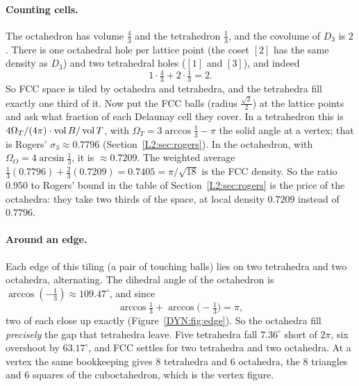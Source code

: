 \paragraph{Counting cells.} The octahedron has volume $\frac43$ and the tetrahedron $\frac13$, and the
covolume of $D_3$ is $2$. There is one octahedral hole per lattice point (the coset $[2]$ has the same
density as $D_3$) and two tetrahedral holes ($[1]$ and $[3]$), and indeed
\[
  1\cdot\tfrac43+2\cdot\tfrac13=2 .
\]
So FCC space is tiled by octahedra and tetrahedra, and the tetrahedra fill exactly one third of it.
Now put the FCC balls (radius $\frac{\sqrt2}2$) at the lattice points and ask what fraction of each
Delaunay cell they cover. In a tetrahedron this is $4\Omega_T/(4\pi)\cdot\operatorname{vol}B/\operatorname{vol} T$, with
$\Omega_T=3\arccos\frac13-\pi$ the solid angle at a vertex; that is Rogers' $\sigma_3\approx0.7796$
(Section~\ref{L2:sec:rogers}). In the octahedron, with $\Omega_O=4\arcsin\frac13$, it is
$\approx0.7209$. The weighted average
$\frac13(0.7796)+\frac23(0.7209)=0.7405=\pi/\sqrt{18}$ is the FCC density. So the ratio $0.950$ to
Rogers' bound in the table of Section~\ref{L2:sec:rogers} is the price of the octahedra: they take two
thirds of the space, at local density $0.7209$ instead of $0.7796$.

\paragraph{Around an edge.} Each edge of this tiling (a pair of touching balls) lies on two tetrahedra
and two octahedra, alternating. The dihedral angle of the octahedron is $\arccos(-\frac13)\approx109.47^\circ$,
and since
\[
  \arccos\tfrac13+\arccos\big(-\tfrac13\big)=\pi ,
\]
two of each close up exactly (Figure~\ref{DYN:fig:edge}). So the octahedra fill \emph{precisely} the
gap that tetrahedra leave. Five tetrahedra fall $7.36^\circ$ short of $2\pi$, six overshoot by $63.17^\circ$,
and FCC settles for two tetrahedra and two octahedra. At a vertex the same bookkeeping gives $8$ tetrahedra and $6$
octahedra, the $8$ triangles and $6$ squares of the cuboctahedron, which is the vertex figure.

